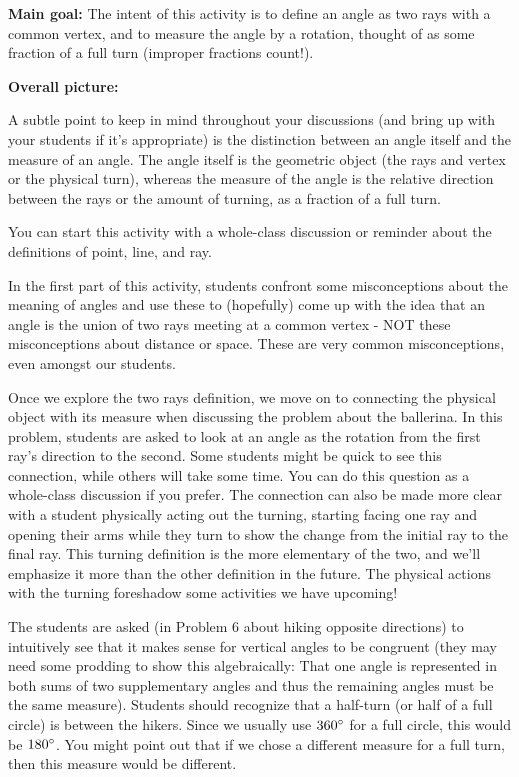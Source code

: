 \documentclass[nooutcomes,noauthor]{ximera}
\begin{document}
\begin{instructorNotes}

{\bf Main goal:}
The intent of this activity is to define an angle as two rays with a common vertex, and to measure the angle by a rotation, thought of as some fraction of a full turn (improper fractions count!).  



{\bf Overall picture:}

A subtle point to keep in mind throughout your discussions (and bring up with your students if it's appropriate) is the distinction between an angle itself and the measure of an angle. The angle itself is the geometric object (the rays and vertex or the physical turn), whereas the measure of the angle is the relative direction between the rays or the amount of turning, as a fraction of a full turn. 



You can start this activity with a whole-class discussion or reminder about the definitions of point, line, and ray.

In the first part of this activity, students confront some misconceptions about the meaning of angles and use these to (hopefully) come up with the idea that an angle is the union of two rays meeting at a common vertex - NOT these misconceptions about distance or space. These are very common misconceptions, even amongst our students.

    Once we explore the two rays definition, we move on to connecting the physical object with its measure when discussing  the problem about the ballerina. In this problem, students are asked to look at an angle as the rotation from the first ray’s direction to the second.  Some students might be quick to see this connection, while others will take some time. You can do this question as a whole-class discussion if you prefer. The connection can also be made more clear with a student physically acting out the turning, starting facing one ray and opening their arms while they turn to show the change from the initial ray to the final ray.  This turning definition is the more elementary of the two, and we'll emphasize it more than the other definition in the future. The physical actions with the turning foreshadow some activities we have upcoming!



 The students are asked (in Problem 6 about hiking opposite directions) to intuitively see that it makes sense for vertical angles to be congruent (they may need some prodding to show this algebraically:  That one angle is represented in both sums of two supplementary angles and thus the remaining angles must be the same measure). Students should recognize that a half-turn (or half of a full circle) is between the hikers.  Since we usually use $360\degree$ for a full circle, this would be $180\degree$.  You might point out that if we chose a different measure for a full turn, then this measure would be different.



\end{instructorNotes}
\end{document}
